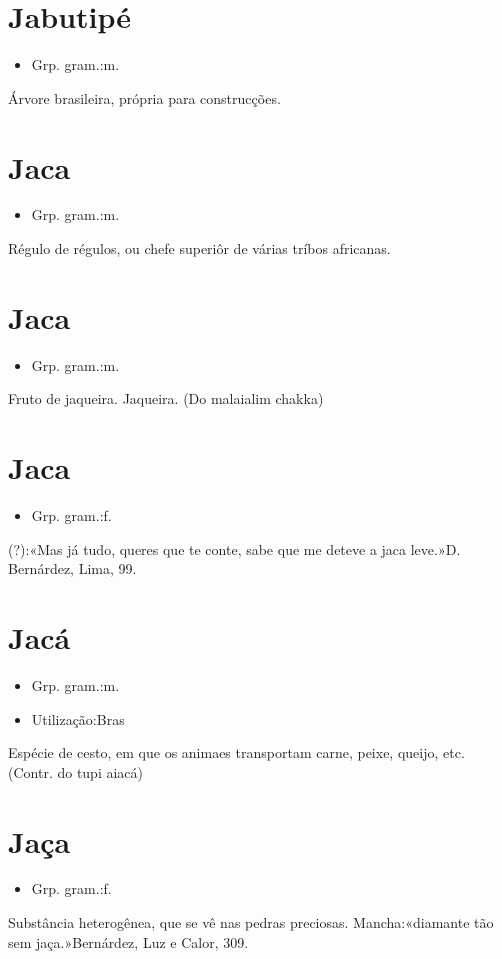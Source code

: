 \documentclass{article}
\begin{document}
\section{Jabutipé}
\begin{itemize}
\item {Grp. gram.:m.}
\end{itemize}
Árvore brasileira, própria para construcções.
\section{Jaca}
\begin{itemize}
\item {Grp. gram.:m.}
\end{itemize}
Régulo de régulos, ou chefe superiôr de várias tríbos africanas.
\section{Jaca}
\begin{itemize}
\item {Grp. gram.:m.}
\end{itemize}
Fruto de jaqueira.
Jaqueira.
(Do malaialim \textunderscore chakka\textunderscore )
\section{Jaca}
\begin{itemize}
\item {Grp. gram.:f.}
\end{itemize}
(?):«\textunderscore Mas já tudo, queres que te conte, sabe que me deteve a jaca leve.\textunderscore »D. Bernárdez, \textunderscore Lima\textunderscore , 99.
\section{Jacá}
\begin{itemize}
\item {Grp. gram.:m.}
\end{itemize}
\begin{itemize}
\item {Utilização:Bras}
\end{itemize}
Espécie de cesto, em que os animaes transportam carne, peixe, queijo, etc.
(Contr. do tupi \textunderscore aiacá\textunderscore )
\section{Jaça}
\begin{itemize}
\item {Grp. gram.:f.}
\end{itemize}
Substância heterogênea, que se vê nas pedras preciosas.
Mancha:«\textunderscore diamante tão sem jaça.\textunderscore »Bernárdez, \textunderscore Luz e Calor\textunderscore , 309.
\end{document}
